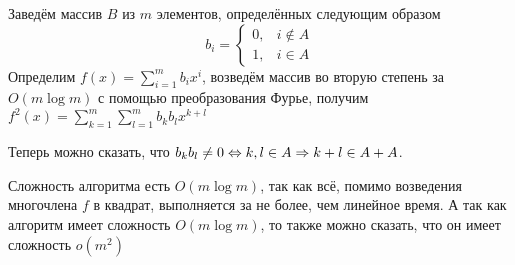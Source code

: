 \documentclass[a4paper,12pt]{article}
\begin{document}
\begin{solution}
	Заведём массив $B$ из $m$ элементов, определённых следующим образом \begin{equation*}
	b_{i} =
	\left\{
	\begin{array}{lr}
	0, & i \notin A\\
	1, & i \in A
	\end{array}
	\right.
	\end{equation*}
	Определим $f(x) = \displaystyle \sum_{i=1}^{m} b_i x^i$, возведём массив во вторую степень за $O(m \log m)$ с помощью преобразования Фурье, получим $f^2(x) = \displaystyle \sum_{k=1}^{m} \displaystyle \sum_{l=1}^{m} b_k b_l x^{k+l}$
	
	Теперь можно сказать, что $b_k b_l \neq 0 \Leftrightarrow k, l \in A \Rightarrow k+l \in A + A$.
	
	Сложность алгоритма есть $O(m \log m)$, так как всё, помимо возведения многочлена $f$ в квадрат, выполняется за не более, чем линейное время. А так как алгоритм имеет сложность $O(m \log m)$, то также можно сказать, что он имеет сложность $o(m^2)$
\end{solution}
\end{document}
